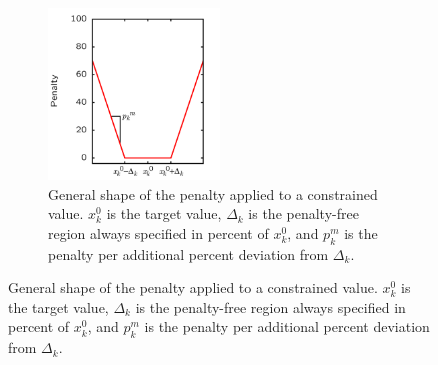 \documentclass[twoside, 11pt, titlepage, captions=nooneline, a4paper, headsepline]{scrbook}%
\newcommand{\9}{\mathrm}
\newcommand{\0}{\,\mathrm}
\begin{document}
\begin{figure}[b!]
\begin{figure}
\centering
\includegraphics[width=0.5\textwidth]{Figures/PenaltyFunction.png}
\caption{General shape of the penalty applied to a constrained value. $x_k^0$ is the target value, $\Delta_k$ is the penalty-free region always specified in percent of $x_k^0$, and $p_k^m$ is the penalty per additional percent deviation from $\Delta_k$.}
\label{figPenaltyFunction}
\end{figure}



\end{figure}
\end{document}
